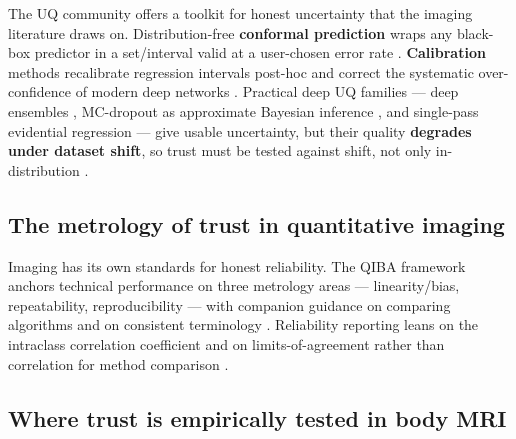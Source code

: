 \documentclass{iopjournal}
\begin{document}
The UQ community offers a toolkit for honest uncertainty that the imaging literature
draws on. Distribution-free \textbf{conformal prediction} wraps any black-box predictor
in a set/interval valid at a user-chosen error rate \cite{shafer2008,angelopoulos2021}.
\textbf{Calibration} methods recalibrate regression intervals post-hoc
\cite{kuleshov2018} and correct the systematic over-confidence of modern deep networks
\cite{guo2017}. Practical deep UQ families --- deep ensembles
\cite{lakshminarayanan2017}, MC-dropout as approximate Bayesian inference
\cite{gal2016}, and single-pass evidential regression \cite{amini2020} --- give usable
uncertainty, but their quality \textbf{degrades under dataset shift}, so trust must be
tested against shift, not only in-distribution \cite{ovadia2019}.

\subsection{The metrology of trust in quantitative imaging}
\label{sec:trust-metrology}

Imaging has its own standards for honest reliability. The QIBA framework anchors
technical performance on three metrology areas --- linearity/bias, repeatability,
reproducibility \cite{raunig2015} --- with companion guidance on comparing algorithms
\cite{obuchowski2015} and on consistent terminology \cite{sullivan2015}. Reliability
reporting leans on the intraclass correlation coefficient
\cite{koo2016}%
{} and on limits-of-agreement rather than correlation for method comparison
\cite{blandaltman1986}.%

\subsection{Where trust is empirically tested in body MRI}
\label{sec:trust-bodymri}
\end{document}
